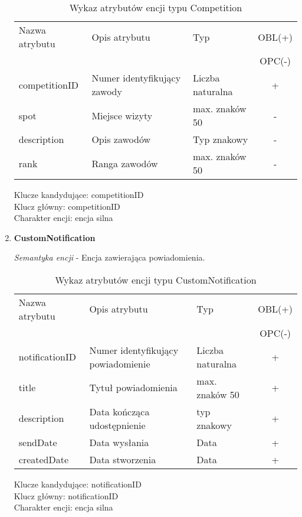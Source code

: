 \documentclass[12pt,twoside]{report}
\begin{document}
\begin{enumerate}[start=1,label={\bfseries ENC\textbackslash00\arabic*}]
	\begin{table}[h!]
		\centering
		\begin{tabular}{|l|l|l|c|}
			\hline
			Nazwa atrybutu & Opis atrybutu & Typ & OBL(+) \\
			& & &  OPC(-) \\
			\hline
			competitionID & Numer identyfikujący zawody & Liczba naturalna & + \\
			\hline
			spot & Miejsce wizyty & max. znaków 50 & - \\
			\hline
			description & Opis zawodów & Typ znakowy & - \\
			\hline
			rank & Ranga zawodów &  max. znaków 50 & - \\
			\hline
		\end{tabular}
		\caption{Wykaz atrybutów encji typu Competition }
	\end{table}
	Klucze kandydujące: competitionID \\
	Klucz główny: competitionID \\
	Charakter encji: encja silna \\
	
	
	\item \textbf{CustomNotification}
	
	\textit{Semantyka encji} - Encja zawierająca powiadomienia.
	
	\begin{table}[h!]
		\centering
		\begin{tabular}{|l|l|l|c|}
			\hline
			Nazwa atrybutu & Opis atrybutu & Typ & OBL(+) \\
			& & &  OPC(-) \\
			\hline
			notificationID & Numer identyfikujący powiadomienie& Liczba naturalna & + \\
			\hline
			title &  Tytuł powiadomienia & max. znaków 50 & + \\
			\hline
			description &  Data kończąca udostępnienie & typ znakowy & + \\
			\hline
			sendDate &  Data wysłania & Data & + \\
			\hline
			createdDate &  Data stworzenia & Data & + \\
			\hline
		\end{tabular}
		\caption{Wykaz atrybutów encji typu CustomNotification }
	\end{table}
	Klucze kandydujące: notificationID \\
	Klucz główny: notificationID \\
	Charakter encji: encja silna \\
	

\end{enumerate}
\end{document}
